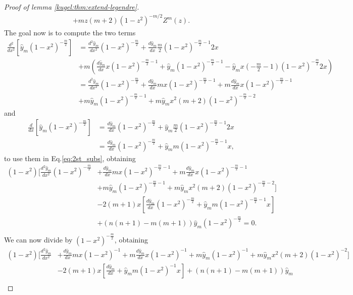 \begin{proof}[Proof of lemma \ref{kugel:thm:extend-legendre}]
\begin{align*}
        + m z(m+2)(1-z^2)^{-m/2} Z^m(z).
  \end{align*}
  The goal now is to compute the two terms 
  \begin{align*}
    \frac{d^2}{dx^2}[\hat{y}_m(1-x^2)^{-\frac{m}{2}}] &=  \frac{d^2\hat{y}_m}{dx^2} (1-x^2)^{-\frac{m}{2}} + \frac{d\hat{y}_m}{dx}\frac{m}{2}(1-x^2)^{-\frac{m}{2}-1}2x \\
    &+ m\left( \frac{d\hat{y}_m}{dx} x (1-x^2)^{-\frac{m}{2}-1} + \hat{y}_m (1-x^2)^{-\frac{m}{2}-1} - \hat{y}_m x (-\frac{m}{2}-1)(1-x^2)^{-\frac{m}{2}} 2x\right) \\
    &= \frac{d^2\hat{y}_m}{dx^2} (1-x^2)^{-\frac{m}{2}} + \frac{d\hat{y}_m}{dx}mx (1-x^2)^{-\frac{m}{2}-1} + m\frac{d\hat{y}_m}{dx}x (1-x^2)^{-\frac{m}{2}-1}\\
    &+ m\hat{y}_m  (1-x^2)^{-\frac{m}{2}-1} + m\hat{y}_m x^2(m+2)(1-x^2)^{-\frac{m}{2}-2}
  \end{align*}
  and
  \begin{align*}
    \frac{d}{dx}[\hat{y}_m(1-x^2)^{-\frac{m}{2}}] &= \frac{d\hat{y}_m}{dx}(1-x^2)^{-\frac{m}{2}} + \hat{y}_m\frac{m}{2}(1-x^2)^{-\frac{m}{2}-1}2x \\
    &= \frac{d\hat{y}_m}{dx}(1-x^2)^{-\frac{m}{2}} + \hat{y}_mm(1-x^2)^{-\frac{m}{2}-1}x,
  \end{align*}
  to use them in Eq.\eqref{eq:2st_subs}, obtaining
  \begin{align*}
    (1-x^2)\biggl[\frac{d^2\hat{y}_m}{dx^2} (1-x^2)^{-\frac{m}{2}} &+ \frac{d\hat{y}_m}{dx}mx (1-x^2)^{-\frac{m}{2}-1} + m\frac{d\hat{y}_m}{dx}x (1-x^2)^{-\frac{m}{2}-1} \\ 
    &+ m\hat{y}_m  (1-x^2)^{-\frac{m}{2}-1} + m\hat{y}_m x^2(m+2)(1-x^2)^{-\frac{m}{2}-2}\biggr] \\
    &-2(m+1)x\left[  \frac{d\hat{y}_m}{dx}(1-x^2)^{-\frac{m}{2}} + \hat{y}_mm(1-x^2)^{-\frac{m}{2}-1}x \right] \\
    &+ (n(n+1)-m(m+1))\hat{y}_m(1-x^2)^{-\frac{m}{2}}=0.\\
  \end{align*}
  We can now divide by $(1-x^2)^{-\frac{m}{2}}$, obtaining
  \begin{align*}
    (1-x^2)\biggl[\frac{d^2\hat{y}_m}{dx^2} &+ \frac{d\hat{y}_m}{dx}mx (1-x^2)^{-1} + m\frac{d\hat{y}_m}{dx}x (1-x^2)^{-1} + m\hat{y}_m  (1-x^2)^{-1} + m\hat{y}_m x^2(m+2)(1-x^2)^{-2}\biggr] \\
    &-2(m+1)x\left[  \frac{d\hat{y}_m}{dx} + \hat{y}_mm(1-x^2)^{-1}x \right] + (n(n+1)-m(m+1))\hat{y}_m\\

\end{align*}
\end{proof}
